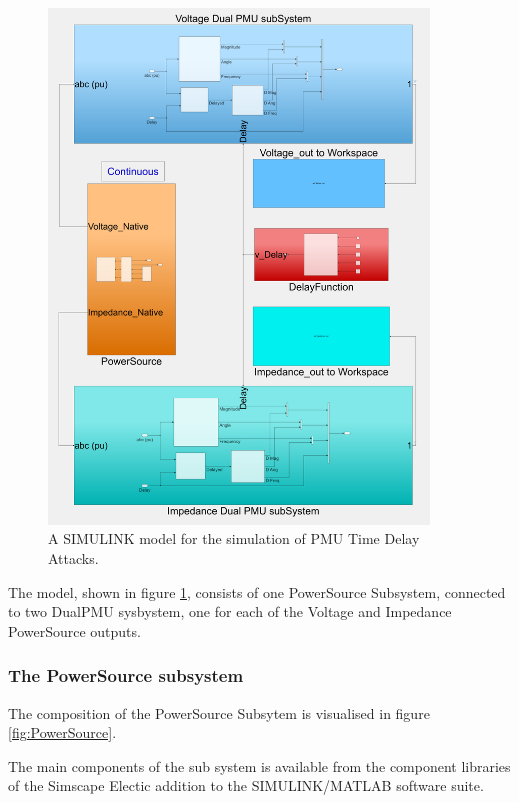  \begin{figure}
\includegraphics[width=0.9\textwidth]{figures/pmuSIM-overview.png}
\caption[PmuSIM SIMULINK model]{A SIMULINK model for the simulation of PMU Time Delay Attacks.}
\label{fig:PMUsim-Overview}
\end{figure}
The model, shown in figure \ref{fig:PMUsim-Overview}, consists of one PowerSource Subsystem, connected to two DualPMU sysbystem, one for each of the Voltage and Impedance PowerSource outputs.


\subsubsection{The PowerSource subsystem}

The composition of the PowerSource Subsytem is visualised in figure \ref{fig:PowerSource}.

The main components of the sub system is available from the component libraries of the Simscape Electic addition to the SIMULINK/MATLAB software suite.

